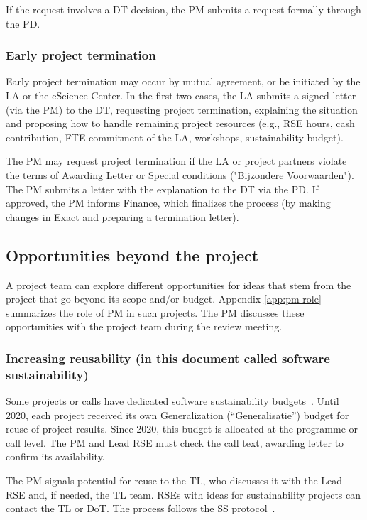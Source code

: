 If the request involves a DT decision, the PM submits a request formally through the PD.

\subsubsection{Early project termination}
Early project termination may occur by mutual agreement, or be initiated by the LA or the eScience Center. In the first two cases, 
the LA submits a signed letter (via the PM) to the DT, requesting project termination, explaining the situation and proposing how to 
handle remaining project resources (e.g., RSE hours, cash contribution, FTE commitment of the LA, workshops, sustainability budget).

The PM may request project termination if the LA or project partners violate the terms of Awarding Letter or Special conditions ("Bijzondere Voorwaarden"). 
The PM submits a letter with the explanation to the DT via the PD. If approved, the PM informs Finance, which finalizes the process (by making changes in Exact and preparing a termination letter).

\subsection{Opportunities beyond the project}
\label{sec:opportunities}
A project team can explore different opportunities for ideas that stem from the project that go beyond its scope and/or
budget. Appendix \ref{app:pm-role} summarizes the role of PM in such projects. The PM discusses these opportunities with the project
team during the review meeting.


\subsubsection{Increasing reusability (in this document called software sustainability)}
\label{sec:opportunities:ss}
Some projects or calls have dedicated software sustainability budgets~\cite{nlesc2024software}. Until 2020, each project 
received its own Generalization (“Generalisatie”) budget for reuse of project results.
Since 2020, this budget is allocated at the programme or call level. The PM and Lead RSE must check the call text, awarding 
letter to confirm its availability.

The PM signals potential for reuse to the TL, who discusses it with the Lead RSE and, if needed, the TL team. 
RSEs with ideas for sustainability projects can contact the TL or DoT. The process follows the SS protocol~\cite{intranet}.

